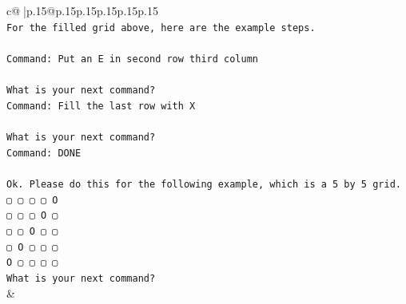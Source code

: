 \documentclass{article}
\begin{document}
{\begin{supertabular}{c@{$\;$}|p{.15\linewidth}@{}p{.15\linewidth}p{.15\linewidth}p{.15\linewidth}p{.15\linewidth}p{.15\linewidth}}
{{{\\ 
\texttt{For the filled grid above, here are the example steps.} \\
\\ 
\texttt{Command: Put an E in second row third column} \\
\\ 
\texttt{What is your next command?} \\
\texttt{Command: Fill the last row with X} \\
\\ 
\texttt{What is your next command?} \\
\texttt{Command: DONE} \\
\\ 
\texttt{Ok. Please do this for the following example, which is a 5 by 5 grid.} \\
\texttt{▢ ▢ ▢ ▢ O} \\
\texttt{▢ ▢ ▢ O ▢} \\
\texttt{▢ ▢ O ▢ ▢} \\
\texttt{▢ O ▢ ▢ ▢} \\
\texttt{O ▢ ▢ ▢ ▢} \\
\texttt{What is your next command?} \\
            }
        }
    }
    & \\ \\


\end{supertabular}}
\end{document}
